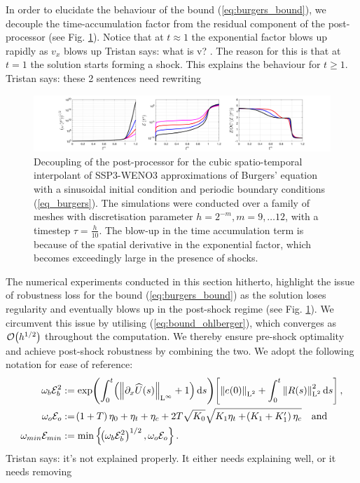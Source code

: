 \documentclass[final]{amsart}
\newcommand{\tristan}[1]{{\color{purple} Tristan says:  #1 }}
\numberwithin{equation}{section}
\begin{document}
In order to elucidate the behaviour of the bound
(\ref{eq:burgers_bound}), we decouple the time-accumulation factor
from the residual component of the post-processor (see
Fig. \ref{fig:SSP3WENO_burgers_decoupled}).  Notice that at $
t\approx1$ the exponential factor blows up rapidly as $v_x$ blows up
\tristan{what is v?}.  The reason for this is that at $t=1$ the
solution starts forming a shock.  This explains the behaviour for
$t \geq 1$. \tristan{these 2 sentences need rewriting}
\begin{figure}[H]	
  \includegraphics[width=\textwidth]{../figures/fig_SSP3WENO3_postshockplots_1x5_sin_IC_burgers_decoupled}	
  \caption{\label{fig:SSP3WENO_burgers_decoupled} Decoupling of the
    post-processor for the cubic spatio-temporal interpolant of
    SSP3-WENO3 approximations of Burgers' equation with a sinusoidal
    initial condition and periodic boundary conditions
    (\ref{eq_burgers}).  The simulations were conducted over a family
    of meshes with discretisation parameter $h = 2^{-m}, m = 9,\dots
    12$, with a timestep $\tau = \tfrac{h}{10}$. The blow-up in the
    time accumulation term is because of the spatial derivative in the
    exponential factor, which becomes exceedingly large in the
    presence of shocks. }
\end{figure}


The numerical experiments conducted in this section hitherto, highlight the issue of robustness loss for the bound  (\ref{eq:burgers_bound}) as the solution loses regularity and eventually blows up in the post-shock regime (see Fig. \ref{fig:SSP3WENO_burgers_decoupled}).  We circumvent this issue by  utilising (\ref{eq:bound_ohlberger}), which converges as $\mathcal{O}\!\left({h^{1/2}}\right)$ throughout the computation.  We thereby ensure pre-shock optimality and achieve post-shock robustness by combining the two.  We adopt the following notation for ease of reference:
\begin{equation}
	\begin{aligned}
		\w_b\mathcal{E}_b^2
		&:=
		\exp\qp{\int_0^t\qp{\Norm{\partial_x\widehat{U}\qp{s}}_{\leb{\infty}}+1}\mathrm{d}s}\qb{\Norm{e\qp{0}}_{\leb{2}}+\int_0^t\Norm{R\qp{s}}^2_{\leb{2}}\mathrm{d}s}
		,\\
		\w_o\mathcal{E}_o
		&:=
		\qp{1+T}\eta_0 
		+
		\eta_t
		+
		\eta_c
		+
		2T\sqrt{K_0}\sqrt{K_1\eta_t+\qp{K_1+K_1'}\eta_c}
		\quad\text{and}\\
		\w_{min}\mathcal{E}_{min}&:=\min\bracegs{\qp{\w_b\mathcal{E}_b^2}^{1/2}, \w_o\mathcal{E}_o}.
	\end{aligned}
\end{equation}
\tristan{it's not explained properly. It either needs explaining well,
  or it needs removing}
\end{document}
